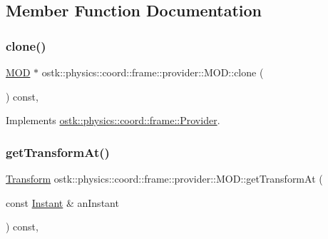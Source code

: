 \subsection{Member Function Documentation}
\mbox{\label{classostk_1_1physics_1_1coord_1_1frame_1_1provider_1_1_m_o_d_ac7d8c3c340359b0bf13728aa93d285e4}} 
\subsubsection{\texorpdfstring{clone()}{clone()}}
{\footnotesize\ttfamily \hyperlink{classostk_1_1physics_1_1coord_1_1frame_1_1provider_1_1_m_o_d}{M\+OD} $\ast$ ostk\+::physics\+::coord\+::frame\+::provider\+::\+M\+O\+D\+::clone (\begin{DoxyParamCaption}{ }\end{DoxyParamCaption}) const\hspace{0.3cm}{\ttfamily [override]}, {\ttfamily [virtual]}}



Implements \hyperlink{classostk_1_1physics_1_1coord_1_1frame_1_1_provider_ae41bc3862d088e9c8d90a79253294ce9}{ostk\+::physics\+::coord\+::frame\+::\+Provider}.

\mbox{\label{classostk_1_1physics_1_1coord_1_1frame_1_1provider_1_1_m_o_d_abe3960b9717d20f5e7945407c76ddb96}} 
\subsubsection{\texorpdfstring{get\+Transform\+At()}{getTransformAt()}}
{\footnotesize\ttfamily \hyperlink{classostk_1_1physics_1_1coord_1_1_transform}{Transform} ostk\+::physics\+::coord\+::frame\+::provider\+::\+M\+O\+D\+::get\+Transform\+At (\begin{DoxyParamCaption}\item[{const \hyperlink{classostk_1_1physics_1_1time_1_1_instant}{Instant} \&}]{an\+Instant }\end{DoxyParamCaption}) const\hspace{0.3cm}{\ttfamily [override]}, {\ttfamily [virtual]}}



